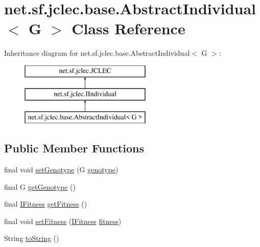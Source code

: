 \hypertarget{classnet_1_1sf_1_1jclec_1_1base_1_1_abstract_individual_3_01_g_01_4}{\section{net.\-sf.\-jclec.\-base.\-Abstract\-Individual$<$ G $>$ Class Reference}
\label{classnet_1_1sf_1_1jclec_1_1base_1_1_abstract_individual_3_01_g_01_4}
}
Inheritance diagram for net.\-sf.\-jclec.\-base.\-Abstract\-Individual$<$ G $>$\-:\begin{figure}[H]
\begin{center}
\leavevmode
\includegraphics[height=3.000000cm]{classnet_1_1sf_1_1jclec_1_1base_1_1_abstract_individual_3_01_g_01_4}
\end{center}
\end{figure}
\subsection*{Public Member Functions}
\begin{DoxyCompactItemize}
\item 
final void \hyperlink{classnet_1_1sf_1_1jclec_1_1base_1_1_abstract_individual_3_01_g_01_4_a335c562b813e8b67ce18bd4d8da703ae}{set\-Genotype} (G \hyperlink{classnet_1_1sf_1_1jclec_1_1base_1_1_abstract_individual_3_01_g_01_4_a17532a6cefcacd7a913749d1f46d798c}{genotype})
\item 
final G \hyperlink{classnet_1_1sf_1_1jclec_1_1base_1_1_abstract_individual_3_01_g_01_4_aab0ec4944079f7b52dc834f8ed79024e}{get\-Genotype} ()
\item 
final \hyperlink{interfacenet_1_1sf_1_1jclec_1_1_i_fitness}{I\-Fitness} \hyperlink{classnet_1_1sf_1_1jclec_1_1base_1_1_abstract_individual_3_01_g_01_4_a0c7384db3b17214bff18ffcbbb21fda0}{get\-Fitness} ()
\item 
final void \hyperlink{classnet_1_1sf_1_1jclec_1_1base_1_1_abstract_individual_3_01_g_01_4_a99712eb48238ca6e13411cf2e68dc26b}{set\-Fitness} (\hyperlink{interfacenet_1_1sf_1_1jclec_1_1_i_fitness}{I\-Fitness} \hyperlink{classnet_1_1sf_1_1jclec_1_1base_1_1_abstract_individual_3_01_g_01_4_a333045009734aca2834c6a7fab508fa2}{fitness})
\item 
String \hyperlink{classnet_1_1sf_1_1jclec_1_1base_1_1_abstract_individual_3_01_g_01_4_a945e26198c23a9ffe41a46aa78a7d141}{to\-String} ()
\end{DoxyCompactItemize}
